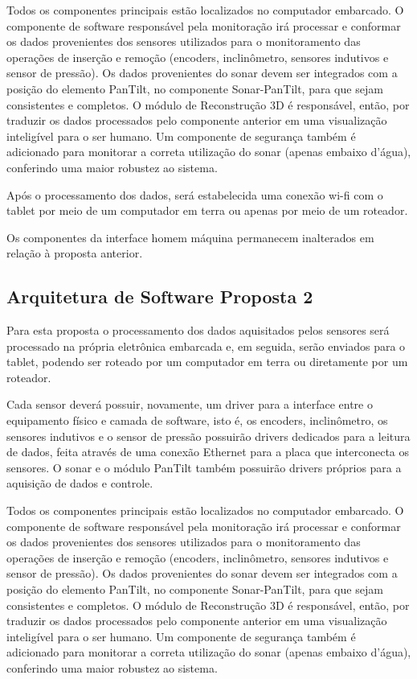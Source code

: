 Todos os componentes principais estão localizados no computador embarcado.
O componente de software responsável pela monitoração irá processar e conformar
os dados provenientes dos sensores utilizados para o monitoramento das operações
de inserção e remoção (encoders, inclinômetro, sensores indutivos
 e sensor de pressão). Os dados provenientes do sonar devem ser integrados com a
 posição do elemento PanTilt,
  no componente Sonar-PanTilt, para que sejam consistentes e completos.  O
  módulo de Reconstrução 3D é responsável,
   então, por traduzir os dados processados pelo componente anterior em uma
   visualização inteligível para o ser humano.
Um componente de segurança também é adicionado para monitorar a correta
utilização do sonar (apenas embaixo d’água), conferindo uma maior robustez ao
sistema.

Após o processamento dos dados, será estabelecida uma conexão wi-fi com o tablet
por meio de um computador em terra ou
 apenas por meio de um roteador.
 
Os componentes da interface homem máquina permanecem inalterados em relação à
proposta anterior.


\subsection{Arquitetura de Software Proposta 2}

Para esta proposta o processamento dos dados aquisitados pelos sensores será
processado na própria eletrônica embarcada e, em seguida,
 serão enviados para o tablet, podendo ser roteado por um computador em terra ou
 diretamente por um roteador.
 
Cada sensor deverá possuir, novamente, um driver para a interface entre o
equipamento físico e camada de software,
 isto é, os encoders, inclinômetro, os sensores indutivos e o sensor de pressão
 possuirão drivers dedicados para a leitura de dados,
feita através de uma conexão Ethernet para a placa que interconecta os sensores.
O sonar e o módulo PanTilt também possuirão drivers próprios para a aquisição de
dados e controle.

Todos os componentes principais estão localizados no computador embarcado.
O componente de software responsável pela monitoração irá processar e conformar
os dados provenientes dos sensores utilizados para o monitoramento das operações
de inserção e remoção (encoders, inclinômetro, sensores indutivos
 e sensor de pressão). Os dados provenientes do sonar devem ser integrados com a
 posição do elemento PanTilt,
  no componente Sonar-PanTilt, para que sejam consistentes e completos.  O
  módulo de Reconstrução 3D é responsável,
   então, por traduzir os dados processados pelo componente anterior em uma
   visualização inteligível para o ser humano.
Um componente de segurança também é adicionado para monitorar a correta
utilização do sonar (apenas embaixo d’água), conferindo uma maior robustez ao
sistema.

